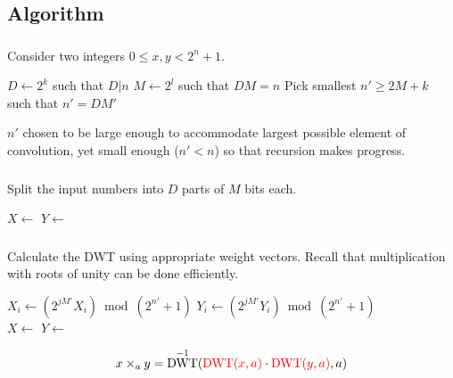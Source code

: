 \documentclass{beamer}
\DeclareMathOperator{\DWT}{DWT}
\begin{document}
\subsection{Algorithm}

\begin{frame}
		\frametitle{\secname}
		\framesubtitle{\subsecname}

		Consider two integers $0 \leq x, y < 2^n + 1$.

		\begin{algorithmic}[1]
				\State $D \gets 2^k$ such that $D | n$
				\State $M \gets 2^l$ such that $DM = n$
				\State Pick smallest $n' \geq 2M + k$ such that $n' = DM'$
		\end{algorithmic}

		$n'$ chosen to be large enough to accommodate largest possible element
		of convolution, yet small enough ($n' < n$) so that recursion makes
		progress.
\end{frame}

\begin{frame}
		\frametitle{\secname}
		\framesubtitle{\subsecname}

		Split the input numbers into $D$ parts of $M$ bits each.

		\begin{algorithmic}[1]
				\State $X \gets $
				\State $Y \gets $
		\end{algorithmic}
\end{frame}

\begin{frame}
		\frametitle{\secname}
		\framesubtitle{\subsecname}

		Calculate the DWT using appropriate weight vectors. Recall that
		multiplication with roots of unity can be done efficiently.

		\begin{algorithmic}[1]
				\State $X_i \gets (2^{jM'} X_i) \bmod (2^{n'} + 1)$
				\State $Y_i \gets (2^{jM'} Y_i) \bmod (2^{n'} + 1)$
				\EndFor
				\\
				\State $X \gets$ 
				\State $Y \gets$ 
		\end{algorithmic}

		\[
				x \times_a y = \DWT^{-1}({\color{red}\DWT(x, a)} \cdot {\color{red}\DWT(y, a)}, a)
		\]
\end{frame}
\end{document}
